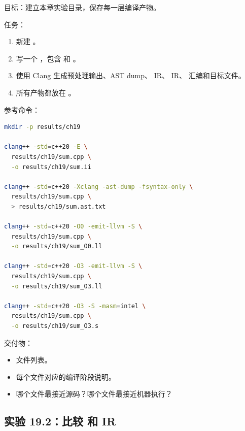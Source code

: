 \begin{labbox}
目标：建立本章实验目录，保存每一层编译产物。

任务：

\begin{enumerate}
  \item 新建 。
  \item 写一个 ，包含  和 。
  \item 使用 Clang 生成预处理输出、AST dump、 IR、 IR、 汇编和目标文件。
  \item 所有产物都放在 。
\end{enumerate}

参考命令：

\begin{lstlisting}[language=bash]
mkdir -p results/ch19

clang++ -std=c++20 -E \
  results/ch19/sum.cpp \
  -o results/ch19/sum.ii

clang++ -std=c++20 -Xclang -ast-dump -fsyntax-only \
  results/ch19/sum.cpp \
  > results/ch19/sum.ast.txt

clang++ -std=c++20 -O0 -emit-llvm -S \
  results/ch19/sum.cpp \
  -o results/ch19/sum_O0.ll

clang++ -std=c++20 -O3 -emit-llvm -S \
  results/ch19/sum.cpp \
  -o results/ch19/sum_O3.ll

clang++ -std=c++20 -O3 -S -masm=intel \
  results/ch19/sum.cpp \
  -o results/ch19/sum_O3.s
\end{lstlisting}

交付物：

\begin{itemize}
  \item 文件列表。
  \item 每个文件对应的编译阶段说明。
  \item 哪个文件最接近源码？哪个文件最接近机器执行？
\end{itemize}
\end{labbox}

\subsection{实验 19.2：比较  和  IR}

